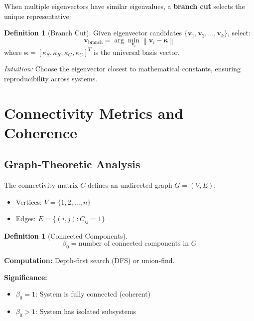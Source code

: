 \documentclass[11pt,a4paper]{article}
\theoremstyle{definition}
\newtheorem{definition}[theorem]{Definition}
\theoremstyle{remark}
\newcommand{\norm}[1]{\left\|#1\right\|}
\begin{document}
When multiple eigenvectors have similar eigenvalues, a \textbf{branch cut} selects the unique representative:

\begin{definition}[Branch Cut]\label{def:branchcut}
Given eigenvector candidates $\{\mathbf{v}_1, \mathbf{v}_2, \ldots, \mathbf{v}_k\}$, select:
\begin{equation}
\mathbf{v}_{\text{branch}} = \arg\min_{\mathbf{v}_i} \norm{\mathbf{v}_i - \boldsymbol{\kappa}}
\end{equation}
where $\boldsymbol{\kappa} = [\kappa_S, \kappa_R, \kappa_G, \kappa_C]^T$ is the universal basis vector.
\end{definition}

\textit{Intuition:} Choose the eigenvector closest to mathematical constants, ensuring reproducibility across systems.

\section{Connectivity Metrics and Coherence}

\subsection{Graph-Theoretic Analysis}

The connectivity matrix $C$ defines an undirected graph $G = (V, E)$:
\begin{itemize}
\item Vertices: $V = \{1, 2, \ldots, n\}$
\item Edges: $E = \{(i, j) : C_{ij} = 1\}$
\end{itemize}

\begin{definition}[Connected Components]\label{def:beta0}
\begin{equation}
\beta_0 = \text{number of connected components in } G
\end{equation}
\end{definition}

\textbf{Computation:} Depth-first search (DFS) or union-find.

\textbf{Significance:}
\begin{itemize}
\item $\beta_0 = 1$: System is fully connected (coherent)
\item $\beta_0 > 1$: System has isolated subsystems
\end{itemize}
\end{document}
